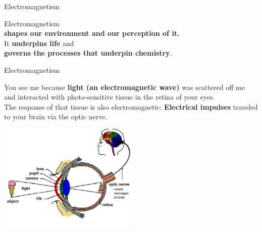 \begin{frame}{Electromagnetism}

\begin{center}
{\Large
Electromagnetism \\ {\bf shapes our environment and our perception of it.}\\
\vspace{0.3cm}
It {\bf underpins life} and \\ {\bf governs the processes that underpin chemistry}.\\
}
\end{center}
\end{frame}


\begin{frame}{Electromagnetism}

You see me because {\bf light (an electromagnetic wave)} was scattered off me
and interacted with photo-sensitive tissue in the retina of your eyes.\\
The response of that tissue is also electromagnetic:
{\bf Electrical impulses} traveled to your brain via the optic nerve.\\

\begin{center}
   \includegraphics[width=0.50\textwidth]{./images/misc/vision_1.png}\\
\end{center}

\end{frame}

%
%
%


